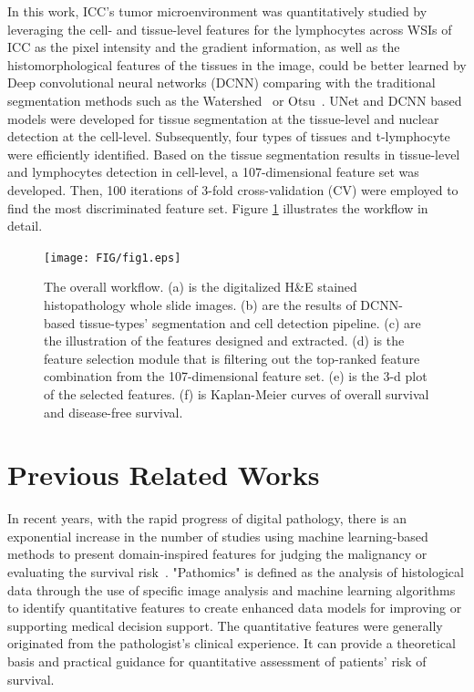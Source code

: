 \documentclass[num-refs]{wiley-article}
\begin{document}
In this work, ICC's tumor microenvironment was quantitatively studied by leveraging the cell- and tissue-level features for the lymphocytes across WSIs of ICC as the pixel intensity and the gradient information, as well as the histomorphological features of the tissues in the image, could be better learned by Deep convolutional neural networks (DCNN) comparing with the traditional segmentation methods such as the Watershed~\cite{vincent1991watersheds} or Otsu~\cite{otsu1979threshold}. UNet and DCNN based models were developed for tissue segmentation at the tissue-level and nuclear detection at the cell-level. Subsequently, four types of tissues and t-lymphocyte were efficiently identified. Based on the tissue segmentation results in tissue-level and lymphocytes detection in cell-level, a 107-dimensional feature set was developed. Then, 100 iterations of 3-fold cross-validation (CV) were employed to find the most discriminated feature set. Figure \ref{fig1} illustrates the workflow in detail.

\begin{figure}[h!]
\centering
\texttt{[image: FIG/fig1.eps]}
\caption{The overall workflow. (a) is the digitalized H\&E stained histopathology whole slide images. (b) are the results of DCNN-based tissue-types' segmentation and cell detection pipeline. (c) are the illustration of the features designed and extracted. (d) is the feature selection module that is filtering out the top-ranked feature combination from the 107-dimensional feature set. (e) is the 3-d plot of the selected features. (f) is Kaplan-Meier curves of overall survival and disease-free survival.}
\label{fig1}
\end{figure}

\section{Previous Related Works}
In recent years, with the rapid progress of digital pathology, there is an exponential increase in the number of studies using machine learning-based methods to present domain-inspired features for judging the malignancy or evaluating the survival risk~\cite{2017Prediction,2018Nuclear,2017An,2019Superpixel,2016Predicting,2013Spatially,2015Fractal,2020Latent,2013Spatial}. "Pathomics" is defined as the analysis of histological data through the use of specific image analysis and machine learning algorithms to identify quantitative features to create enhanced data models for improving or supporting medical decision support. The quantitative features were generally originated from the pathologist's clinical experience. It can provide a theoretical basis and practical guidance for quantitative assessment of patients' risk of survival.
\end{document}
